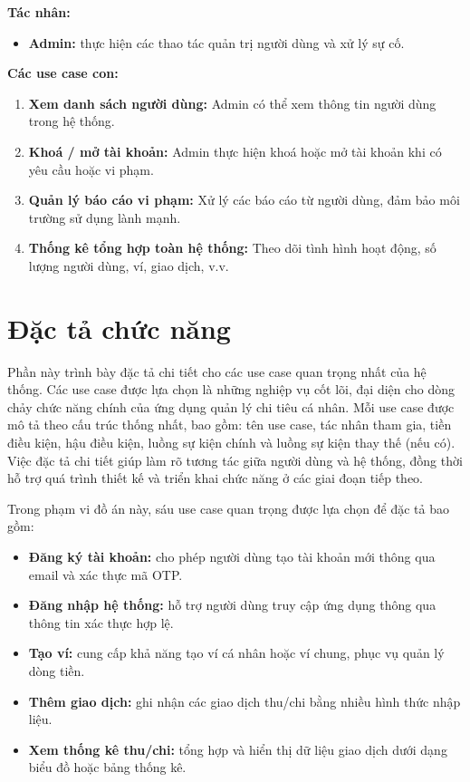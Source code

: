 \documentclass[../DoAn.tex]{subfiles}
\begin{document}
\textbf{Tác nhân:}
\begin{itemize}
    \item \textbf{Admin:} thực hiện các thao tác quản trị người dùng và xử lý sự cố.
\end{itemize}

\textbf{Các use case con:}
\begin{enumerate}
    \item \textbf{Xem danh sách người dùng:} Admin có thể xem thông tin người dùng trong hệ thống.
    \item \textbf{Khoá / mở tài khoản:} Admin thực hiện khoá hoặc mở tài khoản khi có yêu cầu hoặc vi phạm.
    \item \textbf{Quản lý báo cáo vi phạm:} Xử lý các báo cáo từ người dùng, đảm bảo môi trường sử dụng lành mạnh.
    \item \textbf{Thống kê tổng hợp toàn hệ thống:} Theo dõi tình hình hoạt động, số lượng người dùng, ví, giao dịch, v.v.
\end{enumerate}

\section{Đặc tả chức năng}
\label{section:2.3}

Phần này trình bày đặc tả chi tiết cho các use case quan trọng nhất của hệ thống. 
Các use case được lựa chọn là những nghiệp vụ cốt lõi, đại diện cho dòng chảy chức năng chính của ứng dụng quản lý chi tiêu cá nhân. 
Mỗi use case được mô tả theo cấu trúc thống nhất, bao gồm: tên use case, tác nhân tham gia, tiền điều kiện, hậu điều kiện, luồng sự kiện chính và luồng sự kiện thay thế (nếu có). 
Việc đặc tả chi tiết giúp làm rõ tương tác giữa người dùng và hệ thống, đồng thời hỗ trợ quá trình thiết kế và triển khai chức năng ở các giai đoạn tiếp theo.

Trong phạm vi đồ án này, sáu use case quan trọng được lựa chọn để đặc tả bao gồm:

\begin{itemize}
    \item \textbf{Đăng ký tài khoản:} cho phép người dùng tạo tài khoản mới thông qua email và xác thực mã OTP.
    \item \textbf{Đăng nhập hệ thống:} hỗ trợ người dùng truy cập ứng dụng thông qua thông tin xác thực hợp lệ.
    \item \textbf{Tạo ví:} cung cấp khả năng tạo ví cá nhân hoặc ví chung, phục vụ quản lý dòng tiền.
    \item \textbf{Thêm giao dịch:} ghi nhận các giao dịch thu/chi bằng nhiều hình thức nhập liệu.
    \item \textbf{Xem thống kê thu/chi:} tổng hợp và hiển thị dữ liệu giao dịch dưới dạng biểu đồ hoặc bảng thống kê.
\end{itemize}
\end{document}
